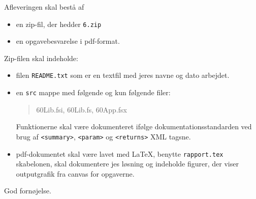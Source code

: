 \documentclass[a4paper,12pt]{article}
\newcommand{\exerciseNumber}{6}
\begin{document}
Afleveringen skal bestå af
\begin{itemize}
  \item en zip-fil, der hedder \texttt{\exerciseNumber\typeLetter.zip}
  \item en opgavebesvarelse i pdf-format.
\end{itemize}
Zip-filen skal indeholde:
\begin{itemize}
\item filen \texttt{README.txt} som er en textfil med jeres navne og dato arbejdet.
\item en \texttt{src} mappe med følgende og kun
  følgende filer:
  \begin{quote}
    \exerciseNumber\typeLetter0Lib.fsi, \exerciseNumber\typeLetter0Lib.fs, \exerciseNumber\typeLetter0App.fsx
  \end{quote}
  Funktionerne skal være dokumenteret ifølge dokumentationsstandarden ved brug af \verb|<summary>|, \verb|<param>| og \verb|<returns>| XML tagsne.
  \item pdf-dokumentet skal være lavet med \LaTeX, benytte \lstinline[language=console]{rapport.tex} skabelonen, skal dokumentere jes løsning og indeholde figurer, der viser outputgrafik fra canvas for opgaverne.
\end{itemize}

\flushright God fornøjelse.
\end{document}
